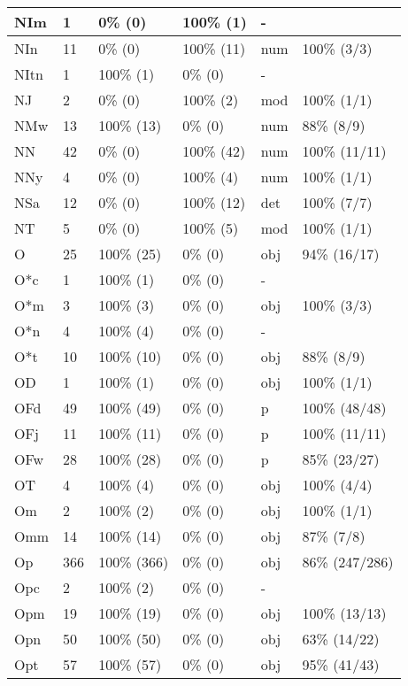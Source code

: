 \begin{figure*}
\begin{tabular}{|l|l|l|l||l|l|}
\hline
 NIm & 1 & 0\% (0) & 100\% (1) & - &  \\ 
\hline
 NIn & 11 & 0\% (0) & 100\% (11) & num & 100\% (3/3) \\ 
\hline
 NItn & 1 & 100\% (1) & 0\% (0) & - &  \\ 
\hline
 NJ & 2 & 0\% (0) & 100\% (2) & mod & 100\% (1/1) \\ 
\hline
 NMw & 13 & 100\% (13) & 0\% (0) & num & 88\% (8/9) \\ 
\hline
 NN & 42 & 0\% (0) & 100\% (42) & num & 100\% (11/11) \\ 
\hline
 NNy & 4 & 0\% (0) & 100\% (4) & num & 100\% (1/1) \\ 
\hline
 NSa & 12 & 0\% (0) & 100\% (12) & det & 100\% (7/7) \\ 
\hline
 NT & 5 & 0\% (0) & 100\% (5) & mod & 100\% (1/1) \\ 
\hline
 O & 25 & 100\% (25) & 0\% (0) & obj & 94\% (16/17) \\ 
\hline
 O*c & 1 & 100\% (1) & 0\% (0) & - &  \\ 
\hline
 O*m & 3 & 100\% (3) & 0\% (0) & obj & 100\% (3/3) \\ 
\hline
 O*n & 4 & 100\% (4) & 0\% (0) & - &  \\ 
\hline
 O*t & 10 & 100\% (10) & 0\% (0) & obj & 88\% (8/9) \\ 
\hline
 OD & 1 & 100\% (1) & 0\% (0) & obj & 100\% (1/1) \\ 
\hline
 OFd & 49 & 100\% (49) & 0\% (0) & p & 100\% (48/48) \\ 
\hline
 OFj & 11 & 100\% (11) & 0\% (0) & p & 100\% (11/11) \\ 
\hline
 OFw & 28 & 100\% (28) & 0\% (0) & p & 85\% (23/27) \\ 
\hline
 OT & 4 & 100\% (4) & 0\% (0) & obj & 100\% (4/4) \\ 
\hline
 Om & 2 & 100\% (2) & 0\% (0) & obj & 100\% (1/1) \\ 
\hline
 Omm & 14 & 100\% (14) & 0\% (0) & obj & 87\% (7/8) \\ 
\hline
 Op & 366 & 100\% (366) & 0\% (0) & obj & 86\% (247/286) \\ 
\hline
 Opc & 2 & 100\% (2) & 0\% (0) & - &  \\ 
\hline
 Opm & 19 & 100\% (19) & 0\% (0) & obj & 100\% (13/13) \\ 
\hline
 Opn & 50 & 100\% (50) & 0\% (0) & obj & 63\% (14/22) \\ 
\hline
 Opt & 57 & 100\% (57) & 0\% (0) & obj & 95\% (41/43) \\ 
\hline
\end{tabular}
\end{figure*}
